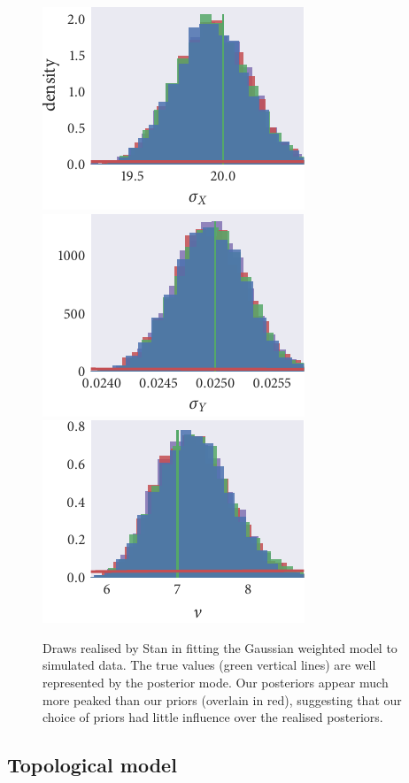 \begin{figure}[tbp]
  \includegraphics{gauss_hist_sigma_X.pdf}%
  \includegraphics{gauss_hist_sigma_Y.pdf}%
  \includegraphics{gauss_hist_nu.pdf}
  \caption{Draws realised by Stan in fitting the Gaussian weighted model to
    simulated data. The true values (green vertical lines) are well
    represented by the posterior mode. Our posteriors appear much more peaked
    than our priors (overlain in red), suggesting that our choice of priors
    had little influence over the realised posteriors.}
  \label{fig:gauss_hist}
\end{figure}

\subsection{Topological model}

